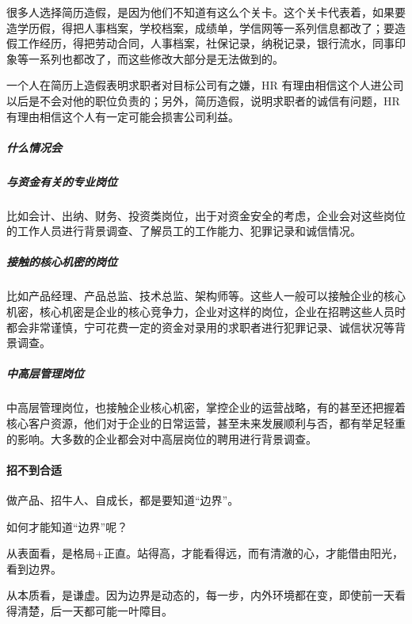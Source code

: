 \documentclass[letterpaper,10pt,english]{sphinxmanual}
\begin{document}
很多人选择简历造假，是因为他们不知道有这么个关卡。这个关卡代表着，如果要造学历假，得把人事档案，学校档案，成绩单，学信网等一系列信息都改了；要造假工作经历，得把劳动合同，人事档案，社保记录，纳税记录，银行流水，同事印象等一系列也都改了，而这些修改大部分是无法做到的。

一个人在简历上造假表明求职者对目标公司有之嫌，HR
有理由相信这个人进公司以后是不会对他的职位负责的；另外，简历造假，说明求职者的诚信有问题，HR
有理由相信这个人有一定可能会损害公司利益。%
\begin{footnote}[898]\sphinxAtStartFootnote
{}
%
\end{footnote}


\subparagraph{什么情况会}
\label{\detokenize{chapter_interview/background_survey:id4}}

\subparagraph{与资金有关的专业岗位}
\label{\detokenize{chapter_interview/background_survey:id5}}
比如会计、出纳、财务、投资类岗位，出于对资金安全的考虑，企业会对这些岗位的工作人员进行背景调查、了解员工的工作能力、犯罪记录和诚信情况。


\subparagraph{接触的核心机密的岗位}
\label{\detokenize{chapter_interview/background_survey:id6}}
比如产品经理、产品总监、技术总监、架构师等。这些人一般可以接触企业的核心机密，核心机密是企业的核心竞争力，企业对这样的岗位，企业在招聘这些人员时都会非常谨慎，宁可花费一定的资金对录用的求职者进行犯罪记录、诚信状况等背景调查。


\subparagraph{中高层管理岗位}
\label{\detokenize{chapter_interview/background_survey:id7}}
中高层管理岗位，也接触企业核心机密，掌控企业的运营战略，有的甚至还把握着核心客户资源，他们对于企业的日常运营，甚至未来发展顺利与否，都有举足轻重的影响。大多数的企业都会对中高层岗位的聘用进行背景调查。


\paragraph{招不到合适}
\label{\detokenize{chapter_interview/hire:id1}}\label{\detokenize{chapter_interview/hire::doc}}
做产品、招牛人、自成长，都是要知道“边界”。

如何才能知道“边界”呢？

从表面看，是格局+正直。站得高，才能看得远，而有清澈的心，才能借由阳光，看到边界。

从本质看，是谦虚。因为边界是动态的，每一步，内外环境都在变，即使前一天看得清楚，后一天都可能一叶障目。
\end{document}
